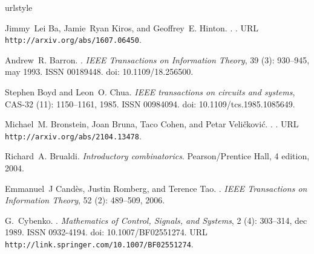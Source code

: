 \documentclass[twoside,11pt]{article}
\begin{document}
\begin{thebibliography}{36}
\providecommand{\natexlab}[1]{#1}
\providecommand{\url}[1]{\texttt{#1}}
\expandafter\ifx\csname urlstyle\endcsname\relax
  \providecommand{\doi}[1]{doi: #1}\else
  \providecommand{\doi}{doi: \begingroup \urlstyle{rm}\Url}\fi

Jimmy~Lei Ba, Jamie~Ryan Kiros, and Geoffrey~E. Hinton.
.
.
\newblock URL \url{http://arxiv.org/abs/1607.06450}.

Andrew~R. Barron.
.
\newblock \emph{IEEE Transactions on Information Theory}, 39
  (3): 930--945, may 1993.
\newblock ISSN 00189448.
\newblock \doi{10.1109/18.256500}.

Stephen Boyd and Leon~O. Chua.
\newblock \emph{IEEE transactions on circuits and systems}, CAS-32
  (11): 1150--1161, 1985.
\newblock ISSN 00984094.
\newblock \doi{10.1109/tcs.1985.1085649}.

Michael~M. Bronstein, Joan Bruna, Taco Cohen, and Petar Veli{\v{c}}kovi{\'{c}}.
.
.
\newblock URL \url{http://arxiv.org/abs/2104.13478}.

Richard~A. Brualdi.
\newblock \emph{Introductory combinatorics}.
\newblock Pearson/Prentice Hall, 4 edition, 2004.

Emmanuel~J Cand{\`{e}}s, Justin Romberg, and Terence Tao.
.
\newblock \emph{IEEE Transactions on Information Theory}, 52
  (2): 489--509, 2006.

G.~Cybenko.
.
\newblock \emph{Mathematics of Control, Signals, and Systems}, 2
  (4): 303--314, dec 1989.
\newblock ISSN 0932-4194.
\newblock \doi{10.1007/BF02551274}.
\newblock URL \url{http://link.springer.com/10.1007/BF02551274}.


\end{thebibliography}
\end{document}
